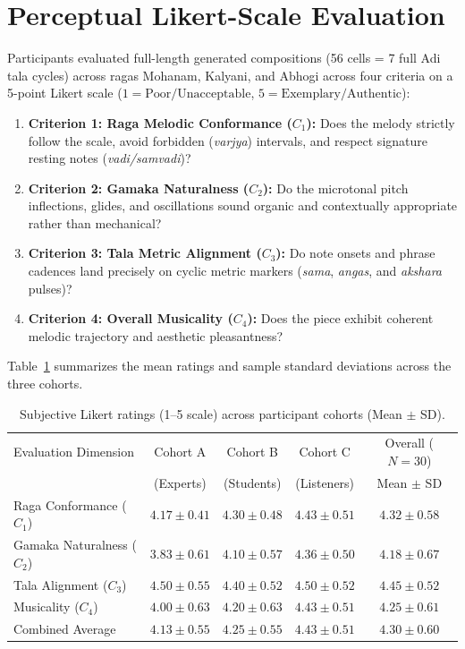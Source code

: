 \documentclass[conference,letterpaper]{IEEEtran}
\begin{document}
\section{Perceptual Likert-Scale Evaluation}
Participants evaluated full-length generated compositions (56 cells = 7 full Adi tala cycles) across ragas Mohanam, Kalyani, and Abhogi across four criteria on a 5-point Likert scale ($1 = \text{Poor/Unacceptable}$, $5 = \text{Exemplary/Authentic}$):
\begin{enumerate}
    \item \textbf{Criterion 1: Raga Melodic Conformance ($C_1$):} Does the melody strictly follow the scale, avoid forbidden (\textit{varjya}) intervals, and respect signature resting notes (\textit{vadi/samvadi})?
    \item \textbf{Criterion 2: Gamaka Naturalness ($C_2$):} Do the microtonal pitch inflections, glides, and oscillations sound organic and contextually appropriate rather than mechanical?
    \item \textbf{Criterion 3: Tala Metric Alignment ($C_3$):} Do note onsets and phrase cadences land precisely on cyclic metric markers (\textit{sama}, \textit{angas}, and \textit{akshara} pulses)?
    \item \textbf{Criterion 4: Overall Musicality ($C_4$):} Does the piece exhibit coherent melodic trajectory and aesthetic pleasantness?
\end{enumerate}

Table~\ref{tab:likert} summarizes the mean ratings and sample standard deviations across the three cohorts.

\begin{table}[t]
\caption{Subjective Likert ratings (1--5 scale) across participant cohorts (Mean $\pm$ SD).}
\label{tab:likert}
\centering\footnotesize
\begin{tabular}{@{}lcccc@{}}
\toprule
Evaluation Dimension & Cohort A & Cohort B & Cohort C & Overall ($N=30$)\\
& (Experts) & (Students) & (Listeners) & Mean $\pm$ SD\\
\midrule
Raga Conformance ($C_1$) & $4.17 \pm 0.41$ & $4.30 \pm 0.48$ & $4.43 \pm 0.51$ & $\mathbf{4.32 \pm 0.58}$\\
Gamaka Naturalness ($C_2$) & $3.83 \pm 0.61$ & $4.10 \pm 0.57$ & $4.36 \pm 0.50$ & $\mathbf{4.18 \pm 0.67}$\\
Tala Alignment ($C_3$) & $4.50 \pm 0.55$ & $4.40 \pm 0.52$ & $4.50 \pm 0.52$ & $\mathbf{4.45 \pm 0.52}$\\
Musicality ($C_4$) & $4.00 \pm 0.63$ & $4.20 \pm 0.63$ & $4.43 \pm 0.51$ & $\mathbf{4.25 \pm 0.61}$\\
\midrule
Combined Average & $\mathbf{4.13 \pm 0.55}$ & $\mathbf{4.25 \pm 0.55}$ & $\mathbf{4.43 \pm 0.51}$ & $\mathbf{4.30 \pm 0.60}$\\
\bottomrule
\end{tabular}
\end{table}
\end{document}
